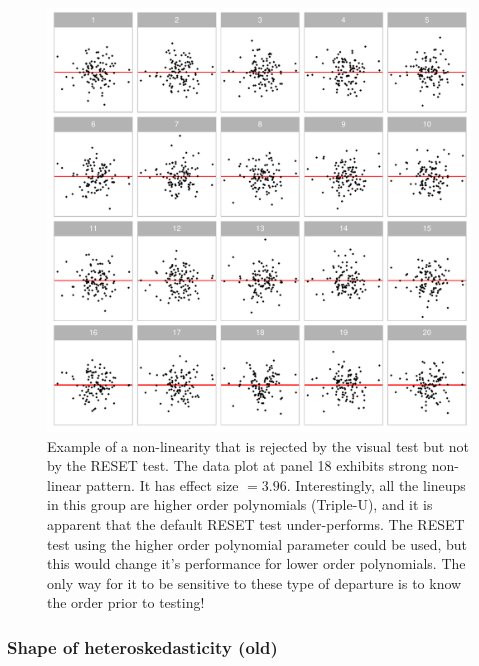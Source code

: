 \documentclass[]{interact}
\theoremstyle{plain}%
\theoremstyle{definition}
\theoremstyle{remark}
\begin{document}
\begin{figure}

{\centering \includegraphics[width=1\linewidth]{paper_comparison_files/figure-latex/poly-example-1} 

}

\caption{Example of a non-linearity that is rejected by the visual test but not by the RESET test. The data plot at panel 18 exhibits strong non-linear pattern. It has effect size $= 3.96$. Interestingly, all the lineups in this group are higher order polynomials (Triple-U), and it is apparent that the default RESET test under-performs. The RESET test using the higher order polynomial parameter could be used, but this would change it's performance for lower order polynomials. The only way for it to be sensitive to these type of departure is to know the order prior to testing!}\label{fig:poly-example}
\end{figure}

\hypertarget{shape-of-heteroskedasticity-old}{%
\subsubsection{Shape of heteroskedasticity
(old)}\label{shape-of-heteroskedasticity-old}}
\end{document}
